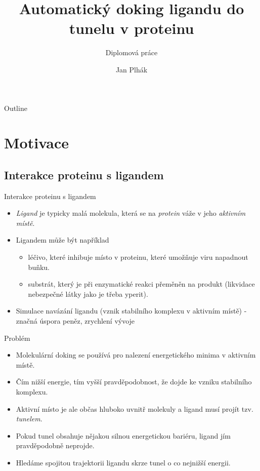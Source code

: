 \documentclass{beamer}
\title[Doking ligandu do tunelu v proteinu]{Automatický doking ligandu do tunelu v proteinu}
\subtitle{Diplomová práce}
\author{Jan Plhák}
\date{}
\begin{document}
\begin{frame}
  \titlepage
\end{frame}

\begin{frame}{Outline}
  \tableofcontents
\end{frame}

\section{Motivace}
\subsection{Interakce proteinu s ligandem}
\begin{frame}{Interakce proteinu s ligandem}
  \begin{itemize}
  \item {
    \textit{Ligand} je typicky malá molekula, která se na \textit{protein} váže  v jeho \textit{aktivním místě}.
    }
    
  \item {
      Ligandem může být například
      \begin{itemize}
     		\item léčivo, které inhibuje místo v proteinu, které umožňuje viru napadnout buňku.
     		\item substrát, který je při enzymatické reakci přeměněn na produkt (likvidace nebezpečné látky jako je třeba yperit).
     \end{itemize}
  }
  
  \item {
  		Simulace navázání ligandu (vznik stabilního komplexu v aktivním místě) - značná úspora peněz, zrychlení vývoje
  }
  \end{itemize}
\end{frame}


\begin{frame}{Problém}
  \begin{itemize}
  \item {
    	Molekulární doking se používá pro nalezení energetického minima v aktivním místě.
    }
  \item Čím nižší energie, tím vyšší pravděpodobnost, že dojde ke vzniku stabilního komplexu.
  \item {
    	Aktivní místo je ale občas hluboko uvnitř molekuly a ligand musí projít tzv. \textit{tunelem}.
    }
    \item {
    	Pokud tunel obsahuje nějakou silnou energetickou bariéru, ligand jím pravděpodobně neprojde.
    }
    \item {
    	Hledáme spojitou trajektorii ligandu skrze tunel o co nejnižší energii.
    }
  \end{itemize}
\end{frame}
\end{document}
